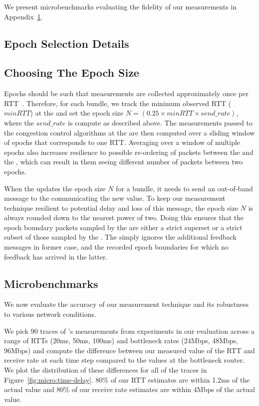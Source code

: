 We present microbenchmarks evaluating the fidelity of our measurements in Appendix~\ref{app:epochs}.

\begin{Appendix}
\section{Epoch Selection Details}\label{app:epochs}
\subsection{Choosing The Epoch Size}
\label{s:measure:epoch}

Epochs should be such that measurements are collected approximately once per RTT~\cite{ccp}. 
Therefore, for each bundle, we track the minimum observed RTT ($minRTT$) at the \inbox and set the epoch size $N = (0.25 \times minRTT \times send\_rate)$, where the $send\_rate$ is compute as described above. The measurements passed to the congestion control algorithms at the \inbox are then computed over a sliding window of epochs that corresponds to one RTT. Averaging over a window of multiple epochs also increases resilience to possible re-ordering of packets between the \inbox and the \outbox, which can result in them seeing different number of packets between two epochs.

When the \inbox updates the epoch size $N$ for a bundle, it needs to send an out-of-band message to the \outbox communicating the new value. To keep our measurement technique resilient to potential delay and loss of this message, the epoch size $N$ is always rounded down to the nearest power of two. Doing this ensures that the epoch boundary packets sampled by the \outbox are either a strict superset or a strict subset of those sampled by the \inbox. The \inbox simply ignores the additional feedback messages in former case, and the recorded epoch boundaries for which no feedback has arrived in the latter.  

\subsection{Microbenchmarks}
\label{s:measure:microbench}
We now evaluate the accuracy of our measurement technique and its robustness to various network conditions. 

We pick 90 traces of \name's measurements from experiments in our evaluation across a range of RTTs (20ms, 50ms, 100ms) and bottleneck rates (24Mbps, 48Mbps, 96Mbps) and compute the difference between our measured value of the RTT and receive rate at each time step compared to the values at the bottleneck router. We plot the distribution of these differences for all of the traces in Figure~\ref{fig:micro:time-delay}. 80\% of our RTT estimates are within 1.2ms of the actual value and 80\% of our receive rate estimates are within 4Mbps of the actual value. 


\end{Appendix}

